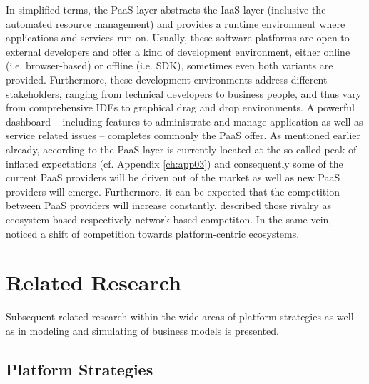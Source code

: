 In simplified terms, the \ac{PaaS} layer abstracts the \ac{IaaS} layer (inclusive the automated resource management) and provides a runtime environment where applications and services run on. Usually, these software platforms are open to external developers and offer a kind of development environment, either online (i.e. browser-based) or offline (i.e. \ac{SDK}), sometimes even both variants are provided. Furthermore, these development environments address different stakeholders, ranging from technical developers to business people, and thus vary from comprehensive \acp{IDE} to graphical drag and drop environments. A powerful dashboard -- including features to administrate and manage application as well as service related issues -- completes commonly the \ac{PaaS} offer.
As mentioned earlier already, according to \citet[p. 5]{Smith2012} the \ac{PaaS} layer is currently located at the so-called peak of inflated expectations (cf. Appendix \ref{ch:app03}) and consequently some of the current \ac{PaaS} providers will be driven out of the market as well as new \ac{PaaS} providers will emerge. Furthermore, it can be expected that the competition between \ac{PaaS} providers will increase constantly. \citet[pp. 117,128-129]{Iyer2010} described those rivalry as ecosystem-based respectively network-based competiton. In the same vein, \citet[pp. 675-676]{Tiwana2010} noticed a shift of competition towards platform-centric ecosystems.

\section{Related Research}\label{ch:tf:rw}

Subsequent related research within the wide areas of platform strategies as well as in modeling and simulating of business models is presented.

\subsection{Platform Strategies}\label{ch:tf:rw:ps}


